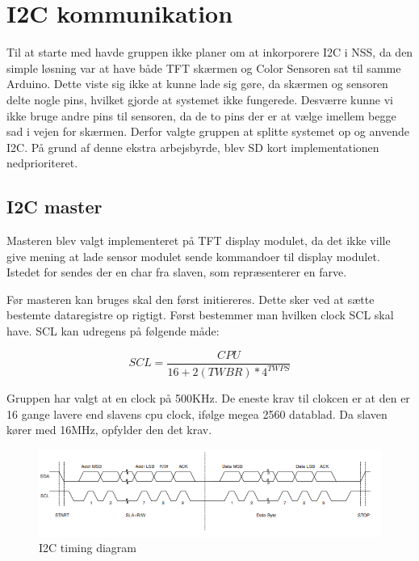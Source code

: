 \graphicspath{{Chapters/Test/}}


\section{I2C kommunikation}
Til at starte med havde gruppen ikke planer om at inkorporere I2C i NSS, da den simple løsning var at have både TFT skærmen og Color Sensoren sat til samme Arduino. Dette viste sig ikke at kunne lade sig gøre, da skærmen og sensoren delte nogle pins, hvilket gjorde at systemet ikke fungerede. Desværre kunne vi ikke bruge andre pins til sensoren, da de to pins der er at vælge imellem begge sad i vejen for skærmen. Derfor valgte gruppen at splitte systemet op og anvende I2C. På grund af denne ekstra arbejsbyrde, blev SD kort implementationen nedprioriteret.



\subsection{I2C master}
Masteren blev valgt implementeret på TFT display modulet, da det ikke ville give mening at lade sensor modulet sende kommandoer til display modulet. Istedet for sendes der en char fra slaven, som repræsenterer en farve.

Før masteren kan bruges skal den først initiereres. Dette sker ved at sætte bestemte dataregistre op rigtigt. Først bestemmer man hvilken clock SCL skal have. SCL kan udregens på følgende måde:

\begin{equation}
SCL= \frac{CPU}{16+2(TWBR)*4^{TWPS}} 
\end{equation}

Gruppen har valgt at en clock på 500KHz. De eneste krav til clokcen er at den er 16 gange lavere end slavens cpu clock, ifølge megea 2560 datablad. Da slaven kører med 16MHz, opfylder den det krav. 



\begin{figure}[H]
	\centering
	\includegraphics[width = 450pt]{Img/I2CTiming.png}
	\caption{I2C timing diagram}
	\label{fig:I2CTIming}
\end{figure}


